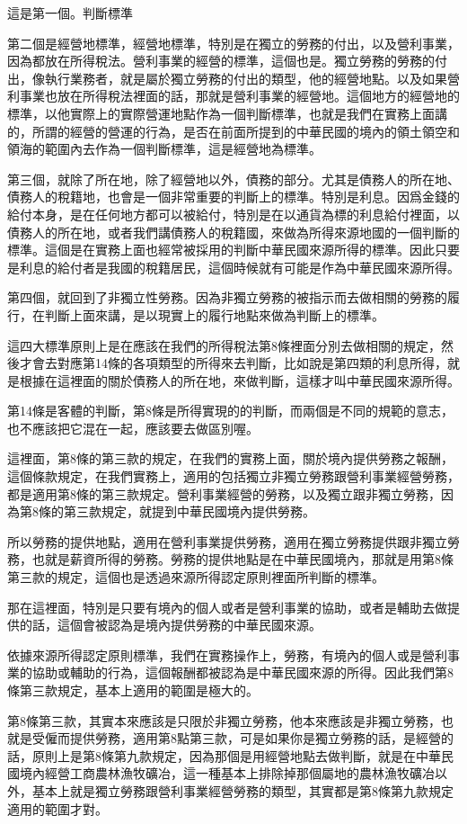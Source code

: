 \documentclass[oneside,sub3section]{ctexbook}
\begin{document}
這是第一個。判斷標準

第二個是經營地標準，經營地標準，特別是在獨立的勞務的付出，以及營利事業，因為都放在所得稅法。營利事業的經營的標準，這個也是。獨立勞務的勞務的付出，像執行業務者，就是屬於獨立勞務的付出的類型，他的經營地點。以及如果營利事業也放在所得稅法裡面的話，那就是營利事業的經營地。這個地方的經營地的標準，以他實際上的實際營運地點作為一個判斷標準，也就是我們在實務上面講的，所謂的經營的營運的行為，是否在前面所提到的中華民國的境內的領土領空和領海的範圍內去作為一個判斷標準，這是經營地為標準。

第三個，就除了所在地，除了經營地以外，債務的部分。尤其是債務人的所在地、債務人的稅籍地，也會是一個非常重要的判斷上的標準。特別是利息。因爲金錢的給付本身，是在任何地方都可以被給付，特別是在以通貨為標的利息給付裡面，以債務人的所在地，或者我們講債務人的稅籍國，來做為所得來源地國的一個判斷的標準。這個是在實務上面也經常被採用的判斷中華民國來源所得的標準。因此只要是利息的給付者是我國的稅籍居民，這個時候就有可能是作為中華民國來源所得。

第四個，就回到了非獨立性勞務。因為非獨立勞務的被指示而去做相關的勞務的履行，在判斷上面來講，是以現實上的履行地點來做為判斷上的標準。

這四大標準原則上是在應該在我們的所得稅法第8條裡面分別去做相關的規定，然後才會去對應第14條的各項類型的所得來去判斷，比如說是第四類的利息所得，就是根據在這裡面的關於債務人的所在地，來做判斷，這樣才叫中華民國來源所得。

第14條是客體的判斷，第8條是所得實現的的判斷，而兩個是不同的規範的意志，也不應該把它混在一起，應該要去做區別喔。

這裡面，第8條的第三款的規定，在我們的實務上面，關於境內提供勞務之報酬，這個條款規定，在我們實務上，適用的包括獨立非獨立勞務跟營利事業經營勞務，都是適用第8條的第三款規定。營利事業經營的勞務，以及獨立跟非獨立勞務，因為第8條的第三款規定，就提到中華民國境內提供勞務。

所以勞務的提供地點，適用在營利事業提供勞務，適用在獨立勞務提供跟非獨立勞務，也就是薪資所得的勞務。勞務的提供地點是在中華民國境內，那就是用第8條第三款的規定，這個也是透過來源所得認定原則裡面所判斷的標準。

那在這裡面，特別是只要有境內的個人或者是營利事業的協助，或者是輔助去做提供的話，這個會被認為是境內提供勞務的中華民國來源。

依據來源所得認定原則標準，我們在實務操作上，勞務，有境內的個人或是營利事業的協助或輔助的行為，這個報酬都被認為是中華民國來源的所得。因此我們第8條第三款規定，基本上適用的範圍是極大的。

第8條第三款，其實本來應該是只限於非獨立勞務，他本來應該是非獨立勞務，也就是受僱而提供勞務，適用第8點第三款，可是如果你是獨立勞務的話，是經營的話，原則上是第8條第九款規定，因為那個是用經營地點去做判斷，就是在中華民國境內經營工商農林漁牧礦冶，這一種基本上排除掉那個屬地的農林漁牧礦冶以外，基本上就是獨立勞務跟營利事業經營勞務的類型，其實都是第8條第九款規定適用的範圍才對。
\end{document}
